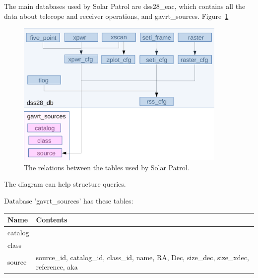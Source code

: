 \documentclass[letterpaper,11pt]{report}
\begin{document}
The main databases used by Solar Patrol are {\ttfamily dss28\_eac}, which
contains all the data about telecope and receiver operations, and
{\ttfamily gavrt\_sources}. Figure~\ref{fig:dbases}
\begin{figure}[h!tb]
    \begin{center}
        \includegraphics[width=4in]{db_relations.png}
        \caption{\label{fig:dbases}The relations between the tables used by
            Solar Patrol.}
    \end{center}
\end{figure}
The diagram can help structure queries.


Database 'gavrt\_sources' has these tables:
\begin{center}
    \begin{tabular}{l|p{4in}}
        \hline
        Name                & Contents \\
        \hline
        {\ttfamily catalog} & \\
        {\ttfamily class}   & \\
        {\ttfamily source}  & source\_id, catalog\_id, class\_id, name, RA, Dec, 
        size\_dec, size\_xdec, reference, aka \\
        \hline
    \end{tabular}
\end{center}
\end{document}
